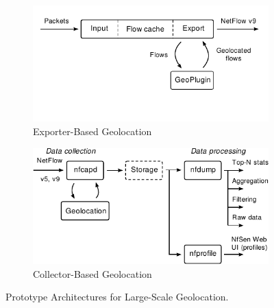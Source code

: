 \begin{figure}[!tb]
    \centering
    \begin{subfigure}[t]{0.5\textwidth}
        \includegraphics[width=\textwidth]{figures/paper-geolocation/exporter-arch}
        \caption{Exporter-Based Geolocation}
        \label{fig:geo-exporter-arch}
    \end{subfigure}%
    \begin{subfigure}[t]{0.5\textwidth}
        \includegraphics[width=\textwidth] {figures/paper-geolocation/collector-arch}
        \caption{Collector-Based Geolocation}
        \label{fig:geo-collector-arch}
    \end{subfigure}
    \caption{Prototype Architectures for Large-Scale Geolocation.}
    \label{fig:geo-architecture}
\end{figure}

